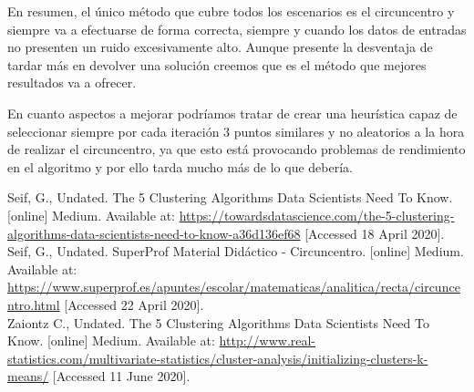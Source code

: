 \documentclass[conference,a4paper]{IEEEtran}
\begin{document}
En resumen, el único método que cubre todos los escenarios es el circuncentro y siempre va a efectuarse de forma correcta, siempre y cuando los datos de entradas no presenten un ruido excesivamente alto. Aunque presente la desventaja de tardar más en devolver una solución creemos que es el método que mejores resultados va a ofrecer.

En cuanto aspectos a mejorar podríamos tratar de crear una heurística capaz de seleccionar siempre por cada iteración 3 puntos similares y no aleatorios a la hora de realizar el circuncentro, ya que esto está provocando problemas de rendimiento en el algoritmo y por ello tarda mucho más de lo que debería.



\clearpage
\begin{thebibliography}{9}
	
	\label{bib:georgeSeif}
	Seif, G., Undated. The 5 Clustering Algorithms Data Scientists Need To Know. [online] Medium. 
	Available at: \href{https://towardsdatascience.com/the-5-clustering-algorithms-data-scientists-need-to-know-a36d136ef68}{https://towardsdatascience.com/the-5-clustering-algorithms-data-scientists-need-to-know-a36d136ef68}
	[Accessed 18 April 2020].\\

	\label{bib:georgeSeif2}
	Seif, G., Undated. SuperProf Material Didáctico - Circuncentro. [online] Medium. 
	Available at: \href{https://www.superprof.es/apuntes/escolar/matematicas/analitica/recta/circuncentro.html}{https://www.superprof.es/apuntes/escolar/matematicas/analitica/recta/circuncentro.html}
	[Accessed 22 April 2020].\\
	
	\label{bib:clustering}
	Zaiontz C., Undated. The 5 Clustering Algorithms Data Scientists Need To Know. [online] Medium. 
	Available at: \href{ http://www.real-statistics.com/multivariate-statistics/cluster-analysis/initializing-clusters-k-means/}{ http://www.real-statistics.com/multivariate-statistics/cluster-analysis/initializing-clusters-k-means/}
	[Accessed 11 June 2020].

\end{thebibliography}
\end{document}
